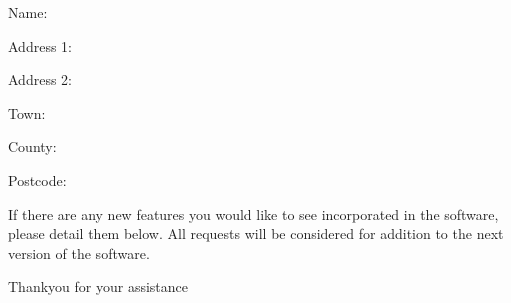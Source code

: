 Name:\hrulefill

Address 1:\hrulefill

Address 2:\hrulefill

Town:\hrulefill

County:\hrulefill

Postcode:\hrulefill
\vspace*{2em}

If there are any new features you would like to see incorporated in the software,
please detail them below. All requests will be considered for addition to the 
next version of the software.
\vfill\vfill
\begin{center}
Thankyou for your assistance
\end{center}

